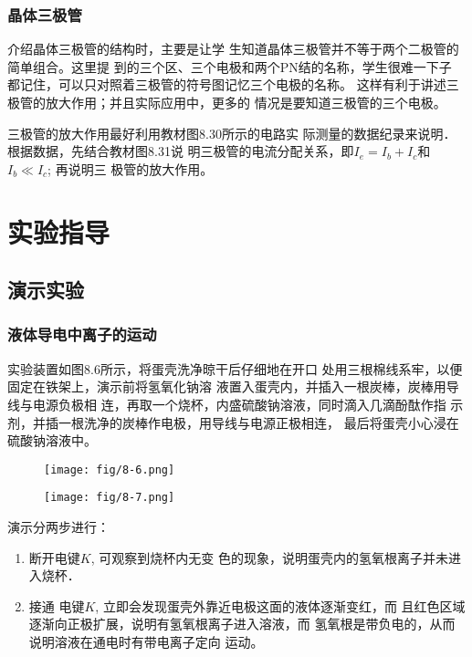 \subsubsection{晶体三极管}

介绍晶体三极管的结构时，主要是让学
生知道晶体三极管并不等于两个二极管的简单组合。这里提
到的三个区、三个电极和两个PN结的名称，学生很难一下子
都记住，可以只对照着三极管的符号图记忆三个电极的名称。
这样有利于讲述三极管的放大作用；并且实际应用中，更多的
情况是要知道三极管的三个电极。

三极管的放大作用最好利用教材图8.30所示的电路实
际测量的数据纪录来说明．根据数据，先结合教材图8.31说
明三极管的电流分配关系，即$I_e=I_b+I_c$和$I_b\ll I_c$; 再说明三
极管的放大作用。

\section{实验指导}
\subsection{演示实验}
\subsubsection{液体导电中离子的运动}
实验装置如图8.6所示，将蛋壳洗净晾干后仔细地在开口
处用三根棉线系牢，以便固定在铁架上，演示前将氢氧化钠溶
液置入蛋壳内，并插入一根炭棒，炭棒用导线与电源负极相
连，再取一个烧杯，内盛硫酸钠溶液，同时滴入几滴酚酞作指
示剂，并插一根洗净的炭棒作电极，用导线与电源正极相连，
最后将蛋壳小心浸在硫酸钠溶液中。
\begin{figure}[htp]\centering
    \begin{minipage}[t]{0.48\textwidth}
    \centering
    \texttt{[image: fig/8-6.png]}
    \caption{}
    \end{minipage}
    \begin{minipage}[t]{0.48\textwidth}
    \centering
    \texttt{[image: fig/8-7.png]}
    \caption{}
    \end{minipage}
    \end{figure}

演示分两步进行：
\begin{enumerate}
    \item 断开电键$K$, 可观察到烧杯内无变
色的现象，说明蛋壳内的氢氧根离子并未进入烧杯．
\item 接通
电键$K$, 立即会发现蛋壳外靠近电极这面的液体逐渐变红，而
且红色区域逐渐向正极扩展，说明有氢氧根离子进入溶液，而
氢氧根是带负电的，从而说明溶液在通电时有带电离子定向
运动。
\end{enumerate}

